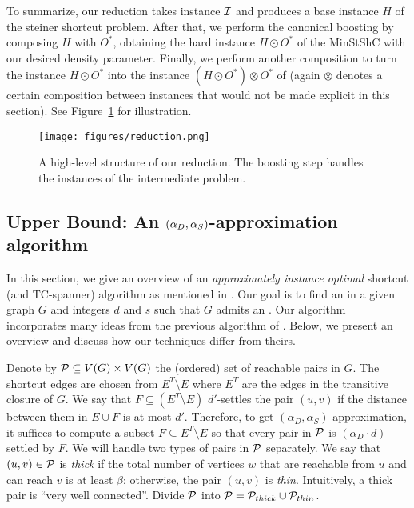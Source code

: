 To summarize, our reduction takes \labcov{} instance $\mathcal{I}$ and produces a base instance $H$ of the steiner shortcut problem. After that, we perform the canonical boosting by composing $H$ with $O^*$, obtaining the hard instance $H \odot O^*$ of the {\sf MinStShC} with our desired density parameter. Finally, we perform another composition to turn the instance $H \odot O^*$ into the instance $(H\odot O^*) \otimes O^*$ of \os{} (again $\otimes$ denotes a certain composition between instances that would not be made explicit in this section).   
 See Figure~\ref{fig:reduction} for illustration. 


\begin{figure}[H]
    \centering
    \texttt{[image: figures/reduction.png]}
    \caption{A high-level structure of our reduction. The boosting step  handles the instances of the intermediate problem. }
    \label{fig:reduction}
\end{figure}




 












\subsection{Upper Bound: An \texorpdfstring{$(\alpha_D, \alpha_S)$}{apxDapxS}-approximation algorithm}
In this section, we give an overview of an \textit{approximately instance optimal} shortcut (and TC-spanner) algorithm as mentioned in . Our goal is to find an  in a given graph $G$ and integers $d$ and $s$ such that $G$ admits an . Our algorithm incorporates many ideas from the previous algorithm of \cite{BermanBMRY13}. Below, we present an overview and discuss how our techniques differ from theirs. 


Denote by $\mathcal{P} \subseteq V(G) \times V(G)$ the (ordered) set of reachable pairs in $G$. 
The shortcut edges are chosen from $E^T \setminus E$ where $E^T$ are the edges in the transitive closure of $G$. We say that $F \subseteq (E^T \setminus E)$ $d'$-settles the pair $(u,v)$ if the distance between them in $E \cup F$ is at most $d'$.  
Therefore, to get $(\alpha_D, \alpha_S)$-approximation, it suffices to compute a subset $F \subseteq E^T \setminus E$ so that every pair in $\mathcal{P}$ is $(\alpha_D \cdot d)$-settled by $F$.  
We will handle two types of pairs in $\mathcal{P}$ separately. 
We say that  $(u,v) \in \mathcal{P}$ is \textit{thick} if the total number of vertices $w$ that are reachable from $u$ and can reach $v$ is at least $\beta$; otherwise, the pair $(u,v)$ is \textit{thin}. Intuitively, a thick pair is ``very well connected''. 
Divide $\mathcal{P}$ into $\mathcal{P} = \mathcal{P}_{thick} \cup \mathcal{P}_{thin}$.

